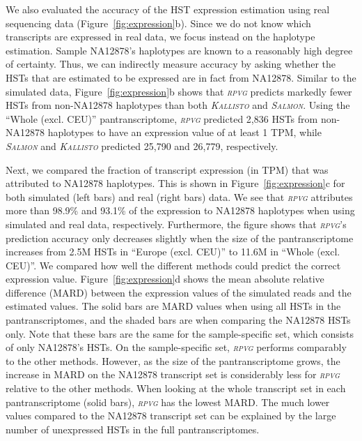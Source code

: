 \documentclass[11pt]{ucthesis}
\newcommand{\tool}[1]{\emph{\textsc{#1}}}
\begin{document}
We also evaluated the accuracy of the HST expression estimation using real sequencing data (Figure~\ref{fig:expression}b). Since we do not know which transcripts are expressed in real data, we focus instead on the haplotype estimation. Sample NA12878's haplotypes are known to a reasonably high degree of certainty. Thus, we can indirectly measure accuracy by asking whether the HSTs that are estimated to be expressed are in fact from NA12878. Similar to the simulated data, Figure~\ref{fig:expression}b shows that \tool{rpvg} predicts markedly fewer HSTs from non-NA12878 haplotypes than both \tool{Kallisto} and \tool{Salmon}. Using the ``Whole (excl. CEU)'' pantranscriptome, \tool{rpvg} predicted 2,836 HSTs from non-NA12878 haplotypes to have an expression value of at least 1 TPM, while \tool{Salmon} and \tool{Kallisto} predicted 25,790 and 26,779, respectively. 

Next, we compared the fraction of transcript expression (in TPM) that was attributed to NA12878 haplotypes. This is shown in Figure~\ref{fig:expression}c for both simulated (left bars) and real (right bars) data. We see that \tool{rpvg} attributes more than 98.9\% and 93.1\% of the expression to NA12878 haplotypes when using simulated and real data, respectively. Furthermore, the figure shows that \tool{rpvg}'s prediction accuracy only decreases slightly when the size of the pantranscriptome increases from 2.5M HSTs in ``Europe (excl. CEU)'' to 11.6M in ``Whole (excl. CEU)''.  
\newline 
\newline
We compared how well the different methods could predict the correct expression value. Figure~\ref{fig:expression}d shows the mean absolute relative difference (MARD) between the expression values of the simulated reads and the estimated values. The solid bars are MARD values when using all HSTs in the pantranscriptomes, and the shaded bars are when comparing the NA12878 HSTs only. Note that these bars are the same for the sample-specific set, which consists of only NA12878's HSTs. On the sample-specific set, \tool{rpvg} performs comparably to the other methods. However, as the size of the pantranscriptome grows, the increase in MARD on the NA12878 transcript set is considerably less for \tool{rpvg} relative to the other methods. When looking at the whole transcript set in each pantranscriptome (solid bars), \tool{rpvg} has the lowest MARD. The much lower values compared to the NA12878 transcript set can be explained by the large number of unexpressed HSTs in the full pantranscriptomes.
\end{document}
